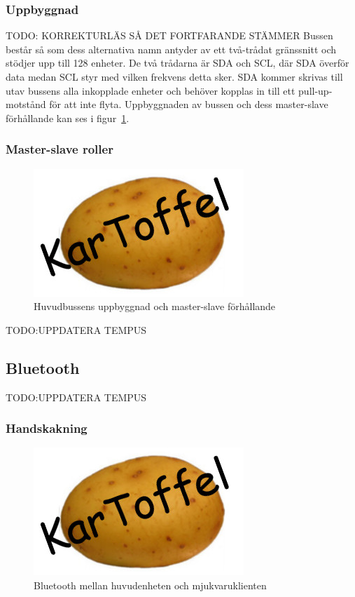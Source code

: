 \documentclass{article}
\begin{document}
\subsubsection{Uppbyggnad}
TODO: KORREKTURLÄS SÅ DET FORTFARANDE STÄMMER 
Bussen består så som dess alternativa namn antyder av ett två-trådat gränssnitt och stödjer upp till 128 enheter. De två trådarna är SDA och SCL, där SDA överför data medan SCL styr med vilken frekvens detta sker. SDA kommer skrivas till utav bussens alla inkopplade enheter och behöver kopplas in till ett pull-up-motstånd för att inte flyta. Uppbyggnaden av bussen och dess master-slave förhållande kan ses i figur~\ref{fig:huvudbuss_masterslave}.

\subsubsection{Master-slave roller}
\begin{figure}[H]
\centering 
\includegraphics[scale=0.56]{Logo}
\caption{Huvudbussens uppbyggnad och master-slave förhållande}
\label{fig:huvudbuss_masterslave}
\end{figure}

TODO:UPPDATERA TEMPUS

\subsection{Bluetooth}
\label{sec:bluetooth}
TODO:UPPDATERA TEMPUS

\subsubsection{Handskakning}
\label{sec:handskakning}
\begin{figure}[H]
\centering 
\includegraphics[scale=0.8]{Logo}
\caption{Bluetooth mellan huvudenheten och mjukvaruklienten}
\label{fig:Kommunikation_Bluetooth}
\end{figure}
\end{document}
